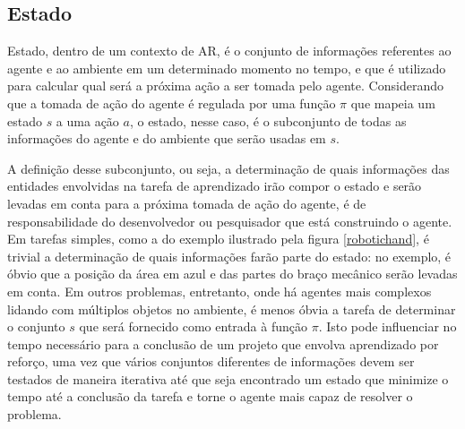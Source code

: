 \documentclass[cic,tc]{iiufrgs}
\newcommand\bruno[1]{\textcolor{magenta}{#1}}
\begin{document}
    \subsection{Estado}
    Estado, dentro de um contexto de AR, é o conjunto de informações referentes ao agente e ao ambiente em um determinado momento no tempo, e que é utilizado para calcular
    qual será a próxima ação a ser tomada pelo agente. Considerando que a tomada de ação do agente é regulada por uma função $\pi$ que mapeia um estado
    $s$ a uma ação $a$, o estado, nesse caso, é o subconjunto de todas as informações do agente e do ambiente que serão usadas em $s$.
    
    
    
    A definição desse subconjunto, ou seja, a determinação de quais informações das entidades envolvidas na tarefa de aprendizado irão compor o estado e serão
    levadas em conta para a próxima tomada de ação do agente, é de responsabilidade do desenvolvedor ou pesquisador que está construindo
    o agente. Em tarefas simples, como a do exemplo ilustrado pela figura \ref{robotichand}, é trivial a determinação de quais informações farão
    parte do estado: no exemplo, é óbvio que a posição da área em azul e das partes do braço mecânico serão levadas em conta. Em outros
    problemas, entretanto, onde há agentes mais complexos lidando com múltiplos objetos no ambiente, é menos óbvia a tarefa de determinar
    o conjunto $s$ que será fornecido como entrada à função $\pi$. Isto pode influenciar no tempo necessário para a conclusão de um projeto
    que envolva aprendizado por reforço, uma vez que vários conjuntos diferentes de informações devem ser testados de maneira iterativa
    até que seja encontrado um estado que minimize o tempo até a conclusão da tarefa e torne o agente mais capaz de resolver o problema.
    
\end{document}
